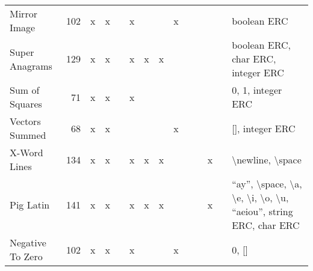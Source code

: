 \documentclass{sig-alternate}
\begin{document}
\begin{table*}
\begin{tabular}{>{\raggedright}p{3.1cm}rccccccccccc>{\raggedright}p{5.5cm}}
Mirror Image               & 102             & x    & x       &       & x       &      &        & x                  &                  &                   &       &            & boolean ERC                                                                                                                                                                                                                 \tabularnewline
Super Anagrams             & 129             & x    & x       &       & x       & x    & x      &                    &                  &                   &       &            & boolean ERC, char ERC, integer ERC                                                                                                                                                                                          \tabularnewline
Sum of Squares             & 71              & x    & x       &       & x       &      &        &                    &                  &                   &       &            & 0, 1, integer ERC                                                                                                                                                                                                           \tabularnewline
Vectors Summed             & 68              & x    & x       &       &         &      &        & x                  &                  &                   &       &            & {[}{]}, integer ERC                                                                                                                                                                                                         \tabularnewline
X-Word Lines               & 134             & x    & x       &       & x       & x    & x      &                    &                  &                   & x     &            & \textbackslash newline, \textbackslash space                                                                                                                                                                                \tabularnewline
Pig Latin                  & 141             & x    & x       &       & x       & x    & x      &                    &                  &                   & x     &            & ``ay'', \textbackslash space, \textbackslash a, \textbackslash e, \textbackslash i, \textbackslash o, \textbackslash u, ``aeiou'', string ERC, char ERC                                                                         \tabularnewline
Negative To Zero           & 102             & x    & x       &       & x       &      &        & x                  &                  &                   &       &            & 0, {[}{]}                                                                                                                                                                                                                   \tabularnewline

\end{tabular}
\end{table*}
\end{document}
